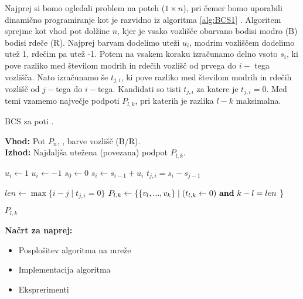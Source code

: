 \documentclass[a4paper, 11pt]{article}
\theoremstyle{definition}
\theoremstyle{definition}
\begin{document}
    Najprej si bomo ogledali problem na poteh ($1 \times n $), pri čemer bomo uporabili
    dinamično programiranje kot je razvidno iz algoritma \ref{alg:BCS1} .    
    Algoritem sprejme kot vhod pot dolžine $n$, kjer je vsako vozlišče
    obarvano bodisi modro (B) bodisi rdeče (R). Najprej barvam dodelimo uteži
    $u_i$, modrim vozliščem dodelimo utež 1, rdečim pa utež -1. 
    Potem na vsakem koraku izračunamo delno vsoto $s_i$, ki pove razliko med
    številom modrih in rdečih vozlišč od prvega do $i-$ tega vozlišča.
    Nato izračunamo še $t_{j,i}$, ki pove razliko med
    številom modrih in rdečih vozlišč od $j-$tega do $i-$tega.  
    Kandidati so tisti $t_{j,i}$ za katere je $t_{j,i}=0$.
    Med temi vzamemo največje podpoti $P_{l,k}$, pri katerih je razlika
    $l-k$ maksimalna. 
\begin{algorithm}[ht]
  \caption{BCS za poti .}
  \label{alg:BCS1}
  \textbf{Vhod:} Pot $P_n$,
  , barve vozlišč (B/R).     \\ 
  \textbf{Izhod:} Najdaljša utežena (povezana) podpot $P_{l,k}$.  
  \begin{algorithmic}[1]
            \State    $u_i  \leftarrow 1$ 
        \Else
            \State $u_i \leftarrow -1$
        \EndIf
    \EndFor
    \State $s_0 \leftarrow 0$
          \State $s_i \leftarrow s_{i-1} + u_i$
            \State $t_{j,i} = s_i - s_{j-1}$
          \EndFor
    \EndFor

    \State $ len \leftarrow \max \{ i-j \mid t_{j,i}=0 \} $
    \State $P_{l,k} \leftarrow \{ \{ v_l,...,v_k \} \mid (t_{l,k} \leftarrow 0)~ \textnormal{\textbf{and}}~ k-l = len $ \}

    \State \Return $P_{l,k}$  \label{alg:pomembna vrstica}
    \EndFunction
  \end{algorithmic}
\end{algorithm}


\textbf{Načrt za naprej:}  
\begin{itemize}
    \item Posplošitev algoritma na mreže
    \item Implementacija algoritma
    \item Eksprerimenti 
\end{itemize} 
\end{document}
